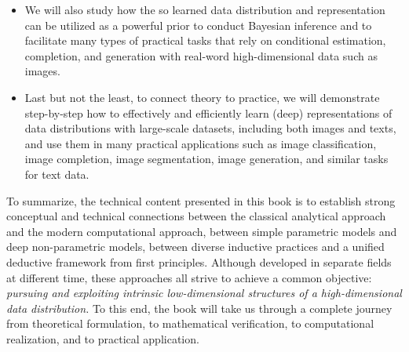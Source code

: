 \documentclass[../../book-main.tex]{subfiles}
\begin{document}
\begin{itemize}
\item We will also study how the so learned data distribution and representation can be utilized as a powerful prior to conduct Bayesian inference and to facilitate many types of practical tasks that rely on conditional estimation, completion, and generation with real-word high-dimensional data such as images. 

\item Last but not the least, to connect theory to practice, we will demonstrate step-by-step how to effectively and efficiently learn (deep) representations of data distributions with large-scale datasets, including both images and texts, and use them in many practical applications such as image classification, image completion, image segmentation, image generation, and similar tasks for text data. 
\end{itemize}

To summarize, the technical content presented in this book is to establish strong conceptual and technical connections between the classical analytical approach and the modern computational approach, between simple parametric models and deep non-parametric models, between diverse inductive practices and a unified deductive framework from first principles. Although developed in separate fields at different time, these approaches all strive to achieve a common objective: {\em pursuing and exploiting intrinsic low-dimensional structures of a high-dimensional data distribution.} To this end, the book will take us through a complete journey from theoretical formulation, to mathematical verification, to computational realization, and to practical application.
\end{document}
